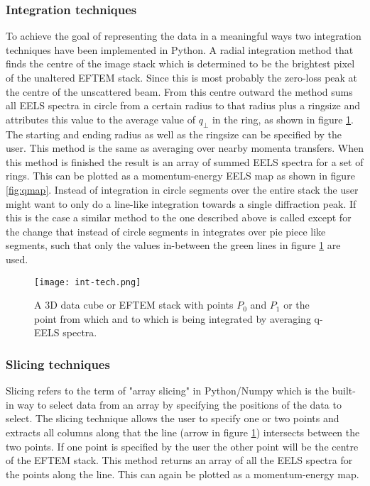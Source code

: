 \begin{multicols}{2}
\subsubsection{Integration techniques}
To achieve the goal of representing the data in a meaningful ways two integration techniques have been implemented in Python.
A radial integration method that finds the centre of the image stack which is determined to be the brightest pixel of the unaltered EFTEM stack. Since this is most probably the zero-loss peak at the centre of the unscattered beam.
From this centre outward the method sums all EELS spectra in circle from a certain radius to that radius plus a ringsize and attributes this value to the average value of $q_{\perp}$ in the ring, as shown in figure \ref{fig:int-tech}.
The starting and ending radius as well as the ringsize can be specified by the user.
This method is the same as averaging over nearby momenta transfers.
When this method is finished the result is an array of summed EELS spectra for a set of rings. This can be plotted as a momentum-energy EELS map as shown in figure \ref{fig:qmap}.
Instead of integration in circle segments over the entire stack the user might want to only do a line-like integration towards a single diffraction peak. If this is the case a similar method to the one described above is called except for the change that instead of circle segments in integrates over pie piece like segments, such that only the values in-between the green lines in figure \ref{fig:int-tech} are used.\\
%
\begin{figure}[H]
	\centering
	\captionsetup{width=0.9\linewidth}
	\texttt{[image: int-tech.png]}
	\caption{A 3D data cube or EFTEM stack with points $P_0$ and $P_1$ or the point from which and to which is being integrated by averaging q-EELS spectra.}
	\label{fig:int-tech}
\end{figure}


\subsubsection{Slicing techniques}
Slicing refers to the term of "array slicing" in Python/Numpy\cite{Harris2020} which is the built-in way to select data from an array by specifying the positions of the data to select. \cite{lutz2013learning,mckinney2018python,10.5555/1593511}
The slicing technique allows the user to specify one or two points and extracts all columns along that the line (arrow in figure \ref{fig:int-tech}) intersects between the two points. If one point is specified by the user the other point will be the centre of the EFTEM stack. This method returns an array of all the EELS spectra for the points along the line. This can again be plotted as a momentum-energy map.\\
%

\end{multicols}
